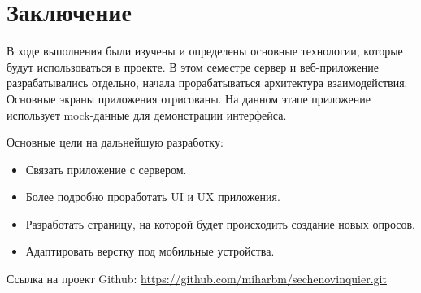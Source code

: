 \section*{Заключение}
\label{sec:3}
В ходе выполнения были изучены и определены основные технологии, которые будут использоваться в проекте.
В этом семестре сервер и веб-приложение разрабатывались отдельно, начала прорабатываться архитектура взаимодействия.
Основные экраны приложения отрисованы.
На данном этапе приложение использует mock-данные для демонстрации интерфейса.

Основные цели на дальнейшую разработку:

\begin{itemize}
    \item Связать приложение с сервером.

    \item Более подробно проработать UI и UX приложения.

    \item Разработать страницу, на которой будет происходить создание новых опросов.

    \item Адаптировать верстку под мобильные устройства.

\end{itemize}

Ссылка на проект Github:
\url{https://github.com/miharbm/sechenovinquier.git}
